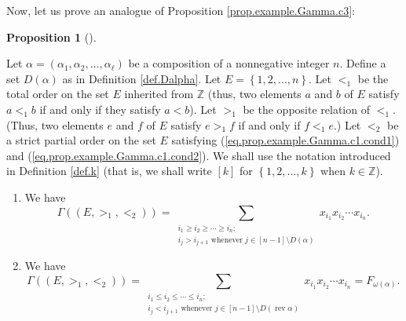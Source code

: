 \documentclass[numbers=enddot,12pt,final,onecolumn,notitlepage,abstracton]{scrartcl}
\theoremstyle{definition}
\newtheorem{prop}[theo]{Proposition}
\newenvironment{proposition}[1][]
{\begin{prop}[#1]\begin{leftbar}}
{\end{leftbar}\end{prop}}
\let\sumnonlimits\sum
\renewcommand{\sum}{\sumnonlimits\limits}
\newenvironment{verlong}{}{}
\begin{document}
\begin{verlong}
\begin{footnotesize}
Now, let us prove an analogue of Proposition \ref{prop.example.Gamma.c3}:

\begin{proposition}
\label{prop.example.Gamma.Sc3}Let $\alpha=\left(  \alpha_{1},\alpha_{2}%
,\ldots,\alpha_{\ell}\right)  $ be a composition of a nonnegative integer $n$.
Define a set $D\left(  \alpha\right)  $ as in Definition \ref{def.Dalpha}. Let
$E=\left\{  1,2,\ldots,n\right\}  $. Let $<_{1}$ be the total order on the set
$E$ inherited from $\mathbb{Z}$ (thus, two elements $a$ and $b$ of $E$ satisfy
$a<_{1}b$ if and only if they satisfy $a<b$). Let $>_{1}$ be the opposite
relation of $<_{1}$. (Thus, two elements $e$ and $f$ of $E$ satisfy $e>_{1}f$
if and only if $f<_{1}e$.) Let $<_{2}$ be a strict partial order on the set
$E$ satisfying (\ref{eq.prop.example.Gamma.c1.cond1}) and
(\ref{eq.prop.example.Gamma.c1.cond2}). We shall use the notation introduced
in Definition \ref{def.k} (that is, we shall write $\left[  k\right]  $ for
$\left\{  1,2,\ldots,k\right\}  $ when $k\in\mathbb{Z}$).

\begin{enumerate}
\item[(a)] We have%
\[
\Gamma\left(  \left(  E,>_{1},<_{2}\right)  \right)  =\sum_{\substack{i_{1}%
\geq i_{2}\geq\cdots\geq i_{n};\\i_{j}>i_{j+1}\text{ whenever }j\in\left[
n-1\right]  \setminus D\left(  \alpha\right)  }}x_{i_{1}}x_{i_{2}}\cdots
x_{i_{n}}.
\]


\item[(b)] We have%
\[
\Gamma\left(  \left(  E,>_{1},<_{2}\right)  \right)  =\sum_{\substack{i_{1}%
\leq i_{2}\leq\cdots\leq i_{n};\\i_{j}<i_{j+1}\text{ whenever }j\in\left[
n-1\right]  \setminus D\left(  \operatorname*{rev}\alpha\right)  }}x_{i_{1}%
}x_{i_{2}}\cdots x_{i_{n}}=F_{\omega\left(  \alpha\right)  }.
\]

\end{enumerate}
\end{proposition}


\end{footnotesize}
\end{verlong}
\end{document}
